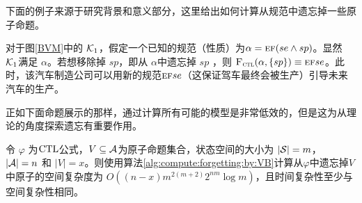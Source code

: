 下面的例子来源于研究背景和意义部分，这里给出如何计算从规范中遗忘掉一些原子命题。 
\begin{example}\label{ex:6}
	对于图\ref{BVM}中的 ${\cal K}_1$，假定一个已知的规范（性质）为$\alpha = \textsc{e}\textsc{f}(se \wedge sp)$。显然 ${\cal K}_1$满足 $\alpha$。若想移除掉 $sp$，即从 $\alpha$中遗忘掉 $sp$ ，则 ${\textsc{F}_{\textsc{ctl}}}(\alpha,\{ sp\}) \equiv \textsc{e}\textsc{f} se$。此时，该汽车制造公司可以用新的规范$\textsc{e}\textsc{f} se$（这保证驾车最终会被生产）引导未来汽车的生产。
\end{example}


正如下面命题展示的那样，通过计算所有可能的模型是非常低效的，但是这为从理论的角度探索遗忘有重要作用。


\begin{proposition}\label{pro:time:alg1}
	令 $\varphi$ 为$\textrm{CTL}$公式，$V\subseteq {\cal A}$为原子命题集合，状态空间的大小为 $|{\cal S}|=m$， $|{\cal A}|=n$ 和 $|V|=x$。则使用算法\ref{alg:compute:forgetting:by:VB}计算从$\varphi$中遗忘掉$V$中原子的空间复杂度为 $O((n-x)m^{2(m+2)}2^{nm}  \log m)$，且时间复杂性至少与空间复杂性相同。
\end{proposition}
